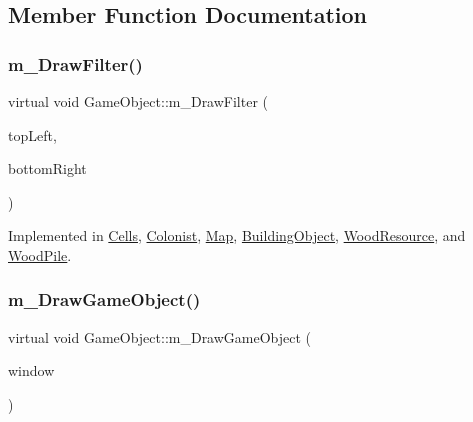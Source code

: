 \subsection{Member Function Documentation}
\mbox{\label{class_game_object_af1a0662ca445d878b163c4648f90259c}} 
\subsubsection{\texorpdfstring{m\+\_\+\+Draw\+Filter()}{m\_DrawFilter()}}
{\footnotesize\ttfamily virtual void Game\+Object\+::m\+\_\+\+Draw\+Filter (\begin{DoxyParamCaption}\item[{sf\+::\+Vector2f}]{top\+Left,  }\item[{sf\+::\+Vector2f}]{bottom\+Right }\end{DoxyParamCaption})\hspace{0.3cm}{\ttfamily [pure virtual]}}



Implemented in \mbox{\hyperlink{class_cells_a9c7eea82ba5ab8a840bbdcc0be25200f}{Cells}}, \mbox{\hyperlink{class_colonist_a77963df06b74b1235341e235ba7b320e}{Colonist}}, \mbox{\hyperlink{class_map_a47f69ae4c316d2efe45bd8a066e982c9}{Map}}, \mbox{\hyperlink{class_building_object_a05e1b08fb5edd953b00e6deade8bad9d}{Building\+Object}}, \mbox{\hyperlink{class_wood_resource_a08e9ac9417b6337b4fe8afcb97783acf}{Wood\+Resource}}, and \mbox{\hyperlink{class_wood_pile_a4434a4c1251a6719b76825a7546ca04c}{Wood\+Pile}}.

\mbox{\label{class_game_object_a184ac59fd5167c55a54b50894e5b6721}} 
\subsubsection{\texorpdfstring{m\+\_\+\+Draw\+Game\+Object()}{m\_DrawGameObject()}}
{\footnotesize\ttfamily virtual void Game\+Object\+::m\+\_\+\+Draw\+Game\+Object (\begin{DoxyParamCaption}\item[{sf\+::\+Render\+Window \&}]{window }\end{DoxyParamCaption})\hspace{0.3cm}{\ttfamily [pure virtual]}}



